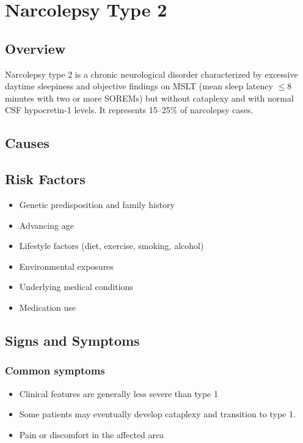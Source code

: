 \chapter{Narcolepsy Type 2}
\label{sec:Narcolepsy Type 2}

\section{Overview}
Narcolepsy type 2 is a chronic neurological disorder characterized by excessive daytime sleepiness and objective findings on MSLT (mean sleep latency $\le$8 minutes with two or more SOREMs) but without cataplexy and with normal CSF hypocretin-1 levels. It represents 15--25\% of narcolepsy cases.
\section{Causes}
\section{Risk Factors}

\begin{itemize}[noitemsep]
  \item Genetic predisposition and family history
  \item Advancing age
  \item Lifestyle factors (diet, exercise, smoking, alcohol)
  \item Environmental exposures
  \item Underlying medical conditions
  \item Medication use
\end{itemize}
\section{Signs and Symptoms}

\subsection{Common symptoms}
\begin{itemize}[noitemsep]
  \item Clinical features are generally less severe than type 1
  \item Some patients may eventually develop cataplexy and transition to type 1.
  \item Pain or discomfort in the affected area
  \end{itemize}

